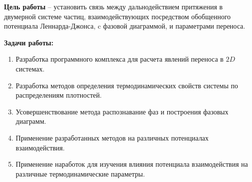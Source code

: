 \textbf{Цель работы} --
установить связь между дальнодействием притяжения в двумерной системе частиц, взаимодействующих посредством обобщенного потенциала Леннарда-Джонса, c фазовой диаграммой, и параметрами переноса.

\textbf{Задачи работы:}
\begin{enumerate}
\item Разработка программного комплекса для расчета явлений переноса в $2D$ системах.
\item Разработка методов определения термодинамических свойств системы по распределениям плотностей. 
\item Усовершенствование метода распознавание фаз и построения фазовых диаграмм.
\item Применение разработанных методов на различных потенциалах взаимодействия.
\item Применение наработок для изучения влияния потенциала взаимодействия на различные термодинамические параметры.
\end{enumerate}
